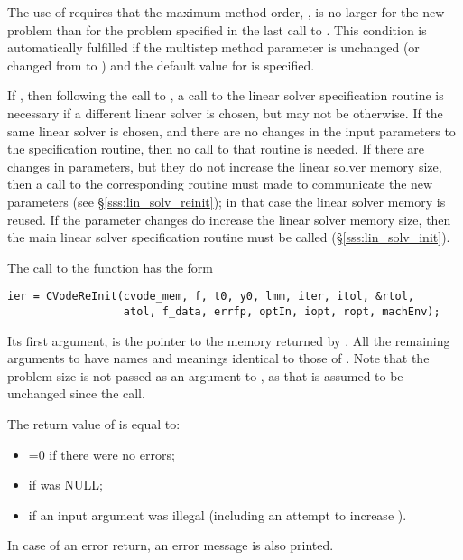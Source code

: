 The use of  requires that the maximum method order,    
, is no larger for the new problem than for the problem  
specified in the last call to .  This condition is  
automatically fulfilled if the multistep method parameter   
is unchanged (or changed from  to ) and the default    
value for  is specified.                                 
                                                                 
If , then following the call to , a call  
to the linear solver specification routine is necessary if a   
different linear solver is chosen, but may not be otherwise.   
If the same linear solver is chosen, and there are no changes  
in the input parameters to the specification routine, then no  
call to that routine is needed.                                
If there are changes in parameters, but they do not increase   
the linear solver memory size, then a call to the corresponding
 routine must made to communicate the new      
parameters (see \S\ref{sss:lin_solv_reinit}); 
in that case the linear solver memory is reused.   
If the parameter changes do increase the linear solver memory  
size, then the main linear solver specification routine must be
called (\S\ref{sss:lin_solv_init}).

The call to the  function has the form
\begin{verbatim}
ier = CVodeReInit(cvode_mem, f, t0, y0, lmm, iter, itol, &rtol, 
                  atol, f_data, errfp, optIn, iopt, ropt, machEnv);
\end{verbatim}
Its first argument,  is the pointer to the {\cvodes}
memory returned by .
All the remaining arguments to  have names and         
meanings identical to those of .  Note that the     
problem size  is not passed as an argument to ,       
as that is assumed to be unchanged since the  call. 

The return value  of  is equal to: 
\begin{itemize}
\item {}=0 if there were no errors; 
\item {} if  was NULL;
\item {} if an input argument was illegal    
      (including an attempt to increase ).
\end{itemize}
In case of an error return, an error message is also printed.  


